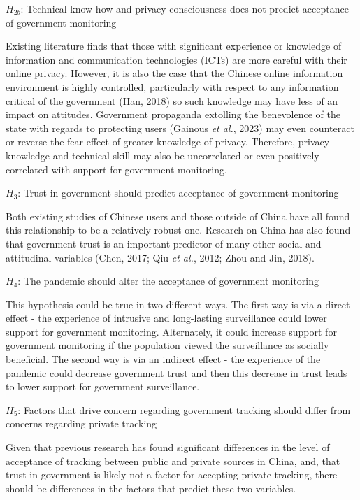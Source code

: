 \documentclass[
  letterpaper,
  DIV=11,
  numbers=noendperiod]{scrartcl}
\begin{document}
\(H_{2b}\): Technical know-how and privacy consciousness does not
predict acceptance of government monitoring

Existing literature finds that those with significant experience or
knowledge of information and communication technologies (ICTs) are more
careful with their online privacy. However, it is also the case that the
Chinese online information environment is highly controlled,
particularly with respect to any information critical of the government
(Han, 2018) so such knowledge may have less of an impact on attitudes.
Government propaganda extolling the benevolence of the state with
regards to protecting users (Gainous \emph{et al.}, 2023) may even
counteract or reverse the fear effect of greater knowledge of privacy.
Therefore, privacy knowledge and technical skill may also be
uncorrelated or even positively correlated with support for government
monitoring.

\(H_3\): Trust in government should predict acceptance of government
monitoring

Both existing studies of Chinese users and those outside of China have
all found this relationship to be a relatively robust one. Research on
China has also found that government trust is an important predictor of
many other social and attitudinal variables (Chen, 2017; Qiu \emph{et
al.}, 2012; Zhou and Jin, 2018).

\(H_4\): The pandemic should alter the acceptance of government
monitoring

This hypothesis could be true in two different ways. The first way is
via a direct effect - the experience of intrusive and long-lasting
surveillance could lower support for government monitoring. Alternately,
it could increase support for government monitoring if the population
viewed the surveillance as socially beneficial. The second way is via an
indirect effect - the experience of the pandemic could decrease
government trust and then this decrease in trust leads to lower support
for government surveillance.

\(H_5\): Factors that drive concern regarding government tracking should
differ from concerns regarding private tracking

Given that previous research has found significant differences in the
level of acceptance of tracking between public and private sources in
China, and, that trust in government is likely not a factor for
accepting private tracking, there should be differences in the factors
that predict these two variables.
\end{document}
